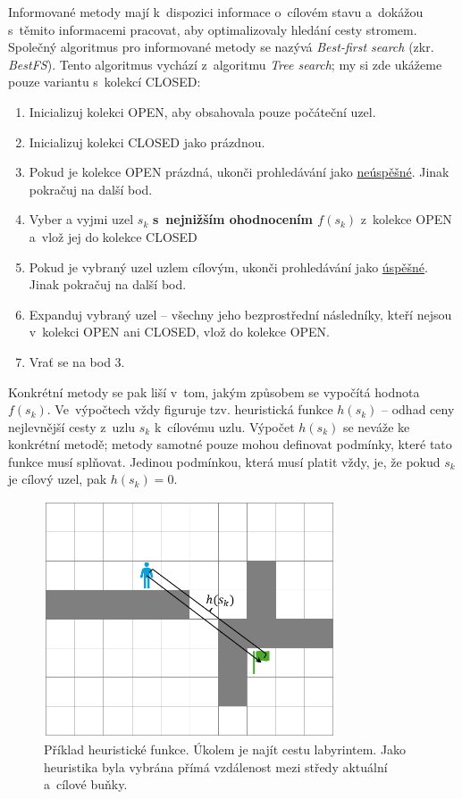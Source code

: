 Informované metody mají k~dispozici informace o~cílovém stavu a~dokážou s~těmito informacemi pracovat, aby optimalizovaly hledání cesty stromem. Společný algoritmus pro informované metody se nazývá \emph{Best-first search} (zkr. \emph{BestFS}). Tento algoritmus vychází z~algoritmu \emph{Tree search}; my si zde ukážeme pouze variantu s~kolekcí CLOSED:
\begin{enumerate}
    \item Inicializuj kolekci OPEN, aby obsahovala pouze počáteční uzel.
    \item Inicializuj kolekci CLOSED jako prázdnou.
    \item Pokud je kolekce OPEN prázdná, ukonči prohledávání jako \underline{neúspěšné}. Jinak pokračuj na další bod.
    \item Vyber a vyjmi uzel ${s_k}$ \textbf{s~nejnižším ohodnocením \boldmath${f(s_k)}$} z~kolekce OPEN a~vlož jej do kolekce CLOSED
    \item Pokud je vybraný uzel uzlem cílovým, ukonči prohledávání jako \underline{úspěšné}. Jinak pokračuj na další bod.
    \item Expanduj vybraný uzel -- všechny jeho bezprostřední následníky, kteří nejsou v~kolekci OPEN ani CLOSED, vlož do kolekce OPEN.
    \item Vrať se na bod 3.
\end{enumerate}

Konkrétní metody se pak liší v~tom, jakým způsobem se vypočítá hodnota ${f(s_k)}$. Ve~výpočtech vždy figuruje tzv. heuristická funkce ${h(s_k)}$ -- odhad ceny nejlevnější cesty z~uzlu ${s_k}$ k~cílovému uzlu. Výpočet ${h(s_k)}$ se neváže ke konkrétní metodě; metody samotné pouze mohou definovat podmínky, které tato funkce musí splňovat. Jedinou podmínkou, která musí platit vždy, je, že pokud $s_k$ je cílový uzel, pak ${h(s_k) = 0}$.

\begin{figure}
    \centering
    \includegraphics[height=7cm]{doc/obrazky-figures/informed-heuristic-example.png}
    \caption{Příklad heuristické funkce. Úkolem je najít cestu labyrintem. Jako heuristika byla vybrána přímá vzdálenost mezi středy aktuální a~cílové buňky.}
    \label{fig:informed-heuristic-example}
\end{figure}


